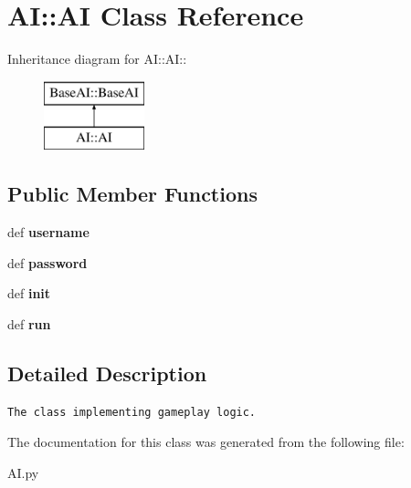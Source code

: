 \hypertarget{classAI_1_1AI}{
\section{AI::AI Class Reference}
\label{classAI_1_1AI}
}
Inheritance diagram for AI::AI::\begin{figure}[H]
\begin{center}
\leavevmode
\includegraphics[height=2cm]{classAI_1_1AI}
\end{center}
\end{figure}
\subsection*{Public Member Functions}
\begin{CompactItemize}
\item 
\hypertarget{classAI_1_1AI_1173d35565e571260327628b5fdbf601}{
def \textbf{username}}
\label{classAI_1_1AI_1173d35565e571260327628b5fdbf601}

\item 
\hypertarget{classAI_1_1AI_0c68d55972c20f5b5c12b3413dccf4f8}{
def \textbf{password}}
\label{classAI_1_1AI_0c68d55972c20f5b5c12b3413dccf4f8}

\item 
\hypertarget{classAI_1_1AI_be85fa052f61e71327d0f066866360ec}{
def \textbf{init}}
\label{classAI_1_1AI_be85fa052f61e71327d0f066866360ec}

\item 
\hypertarget{classAI_1_1AI_0e95ce8db48896cbf1dcf410930ca141}{
def \textbf{run}}
\label{classAI_1_1AI_0e95ce8db48896cbf1dcf410930ca141}

\end{CompactItemize}


\subsection{Detailed Description}


\footnotesize\begin{verbatim}The class implementing gameplay logic.\end{verbatim}
\normalsize
 

The documentation for this class was generated from the following file:\begin{CompactItemize}
\item 
AI.py\end{CompactItemize}
